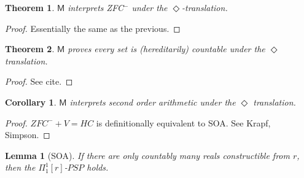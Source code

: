 \documentclass{article}
\newtheorem{lemma}{Lemma}
\newtheorem{corollary}{Corollary}
\newtheorem{theorem}{Theorem}
\begin{document}
\begin{theorem}
    $\mathsf{M}$ interprets ZFC$^-$ under the $\Diamond$-translation.
\end{theorem}
\begin{proof}
    Essentially the same as the previous. 
\end{proof}
\begin{theorem}\label{hcount}
    $\mathsf{M}$ proves every set is (hereditarily) countable under the 
    $\Diamond$ translation.
\end{theorem}
\begin{proof}
    See cite.
\end{proof}
\begin{corollary}\label{soa}
    $\mathsf{M}$ interprets second order arithmetic under the $\Diamond$ translation.
\end{corollary}
\begin{proof}
    $ZFC^- + V = HC$ is definitionally equivalent to SOA. See Krapf, Simpson.
\end{proof}
\begin{lemma}[SOA]\label{sol}
    If there are only countably many reals constructible from $r$, then the $\Pi_1^1[r]$-$PSP$ holds.
\end{lemma}
\end{document}
